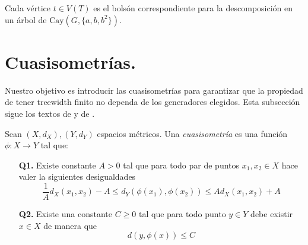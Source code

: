 \documentclass[tesis.tex]{subfiles}
\begin{document}
\begin{ej}
\begin{figure}[H]
\end{figure}


Cada vértice $t \in V(T)$ es el bolsón correspondiente para la descomposición en un árbol de $\text{Cay}(G,\{ a,b,b^2 \})$.	
\end{ej}


\section{Cuasisometrías.}\label{secc_qi}

Nuestro objetivo es introducir las cuasisometrías para garantizar que la propiedad de tener treewidth finito no dependa de los generadores elegidos.
Esta subsección sigue los textos de \cite{bridson2013metric} y de \cite{loh2017geometric}.

\begin{deff}
	Sean $(X,d_X),(Y,d_Y)$ espacios métricos. 
	Una \emph{cuasisometría} es una función $\phi:X \to Y$ tal que:
	\begin{itemize}
		\item[\textbf{Q1.}] Existe constante $A > 0$ tal que para todo par de puntos $x_1,x_2 \in X$ hace valer la siguientes desigualdades
		\[
		\frac{1}{A} d_X(x_1,x_2) - A \le d_Y(\phi(x_1),\phi(x_2)) \le A d_X(x_1,x_2) + A
		\]
		\item[\textbf{Q2.}] Existe una constante $C \ge 0$ tal que para todo punto $y \in Y$ debe existir $x \in X$ de manera que 
		\[
		d(y,\phi(x)) \le C
		\]
	\end{itemize}
\end{deff}
\end{document}

